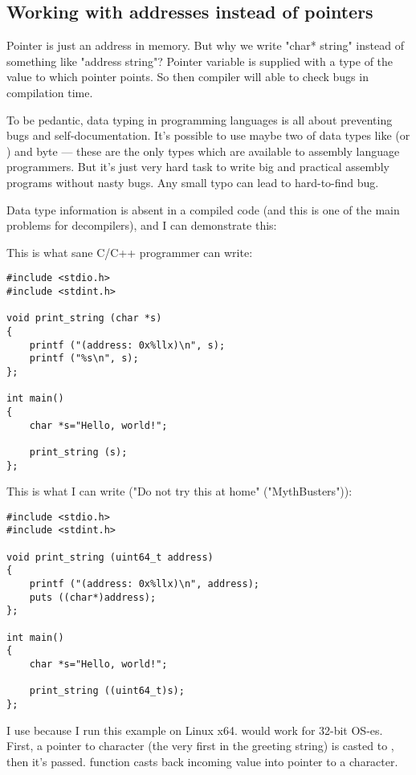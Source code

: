 \subsection{Working with addresses instead of pointers}

Pointer is just an address in memory. But why we write "char* string" instead of something like "address string"?
Pointer variable is supplied with a type of the value to which pointer points.
So then compiler will able to check bugs in compilation time.

To be pedantic, data typing in programming languages is all about preventing bugs and self-documentation.
It's possible to use maybe two of data types like  (or ) and byte --- these are the only types which are available to assembly language programmers.
But it's just very hard task to write big and practical assembly programs without nasty bugs.
Any small typo can lead to hard-to-find bug.

Data type information is absent in a compiled code (and this is one of the main problems for decompilers), and I can demonstrate this:

This is what sane C/C++ programmer can write:

\begin{lstlisting}[style=customc]
#include <stdio.h>
#include <stdint.h>

void print_string (char *s)
{
	printf ("(address: 0x%llx)\n", s);
	printf ("%s\n", s);
};

int main()
{
	char *s="Hello, world!";

	print_string (s);
};
\end{lstlisting}

This is what I can write ("Do not try this at home" ("MythBusters")):

\begin{lstlisting}[style=customc]
#include <stdio.h>
#include <stdint.h>

void print_string (uint64_t address)
{
	printf ("(address: 0x%llx)\n", address);
	puts ((char*)address);
};

int main()
{
	char *s="Hello, world!";

	print_string ((uint64_t)s);
};
\end{lstlisting}

I use  because I run this example on Linux x64.  would work for 32-bit OS-es.
First, a pointer to character (the very first in the greeting string) is casted to , then it's passed.
 function casts back incoming  value into pointer to a character.

